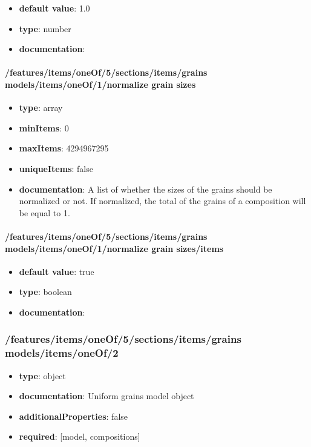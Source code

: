 \begin{itemize}\item {\bf default value}: 1.0
\item {\bf type}: number
\item {\bf documentation}: 
\end{itemize}\paragraph{/features/items/oneOf/5/sections/items/grains models/items/oneOf/1/normalize grain sizes}
\begin{itemize}\item {\bf type}: array
\item {\bf minItems}: 0
\item {\bf maxItems}: 4294967295
\item {\bf uniqueItems}: false
\item {\bf documentation}: A list of whether the sizes of the grains should be normalized or not. If normalized, the total of the grains of a composition will be equal to 1.
\end{itemize}\paragraph{/features/items/oneOf/5/sections/items/grains models/items/oneOf/1/normalize grain sizes/items}
\begin{itemize}\item {\bf default value}: true
\item {\bf type}: boolean
\item {\bf documentation}: 
\end{itemize}\subsubsection{/features/items/oneOf/5/sections/items/grains models/items/oneOf/2}
\begin{itemize}\item {\bf type}: object
\item {\bf documentation}: Uniform grains model object
\item {\bf additionalProperties}: false
\item {\bf required}: [model, compositions]\end{itemize}
